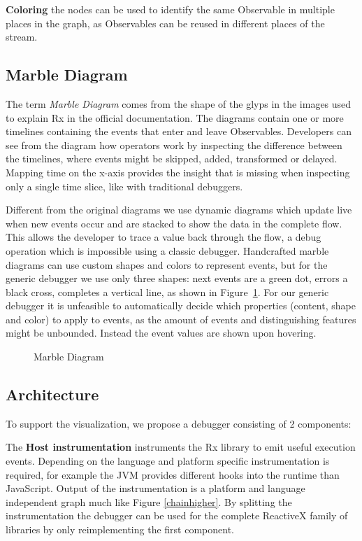 \textbf{Coloring} the nodes can be used to identify the same Observable in multiple places in the graph, as Observables can be reused in different places of the stream.

\subsection{Marble Diagram}
The term \textit{Marble Diagram} comes from the shape of the glyps in the images used to explain Rx in the official documentation. The diagrams contain one or more timelines containing the events that enter and leave Observables. Developers can see from the diagram how operators work by inspecting the difference between the timelines, where events might be skipped, added, transformed or delayed. Mapping time on the x-axis provides the insight that is missing when inspecting only a single time slice, like with traditional debuggers.

Different from the original diagrams we use dynamic diagrams which update live when new events occur and are stacked to show the data in the complete flow. This allows the developer to trace a value back through the flow, a debug operation which is impossible using a classic debugger. Handcrafted marble diagrams can use custom shapes and colors to represent events, but for the generic debugger we use only three shapes: next events are a green dot, errors a black cross, completes a vertical line, as shown in Figure~\ref{marblediagram}. For our generic debugger it is unfeasible to automatically decide which properties (content, shape and color) to apply to events, as the amount of events and distinguishing features might be unbounded. Instead the event values are shown upon hovering.

\begin{figure}
	\centering
	
	\caption{Marble Diagram}
	\label{marblediagram}
\end{figure} 

\subsection{Architecture}
To support the visualization, we propose a debugger consisting of 2 components:

The \textbf{Host instrumentation} instruments the Rx library to emit useful execution events. Depending on the language and platform specific instrumentation is required, for example the JVM provides different hooks into the runtime than JavaScript. Output of the instrumentation is a platform and language independent graph much like Figure \ref{chainhigher}. By splitting the instrumentation the debugger can be used for the complete ReactiveX family of libraries by only reimplementing the first component. 

